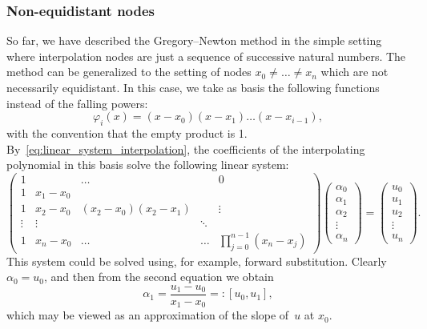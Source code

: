 \subsubsection*{Non-equidistant nodes}%
So far,
we have described the Gregory--Newton method in the simple setting where interpolation nodes are just a sequence of successive natural numbers.
The method can be generalized to the setting of nodes $x_0 \neq \dotsc \neq x_n$ which are not necessarily equidistant.
In this case, we take as basis the following functions instead of the falling powers:
\begin{equation}
    \label{eq:basis_newton}
    \varphi_{i}(x) = (x - x_0) (x - x_1) \dotsc (x - x_{i-1}),
\end{equation}
with the convention that the empty product is 1.
By~\eqref{eq:linear_system_interpolation},
the coefficients of the interpolating polynomial in this basis solve the following linear system:
\begin{equation}
    \label{eq:matrix_newton}
    \begin{pmatrix}
        1 &         & \ldots &        & 0  \\
        1 & x_1-x_0 &        &        &    \\
        1 & x_2-x_0 & (x_2-x_0)(x_2-x_1) &        & \vdots   \\
        \vdots & \vdots  &        & \ddots &    \\
        1 & x_n-x_0 & \ldots & \ldots & \prod_{j=0}^{n-1}(x_n - x_j)
    \end{pmatrix}
    \begin{pmatrix}
        \alpha_0 \\
        \alpha_1 \\
        \alpha_2 \\
        \vdots \\
        \alpha_n
    \end{pmatrix}
    =
    \begin{pmatrix}
        u_0 \\
        u_1 \\
        u_2 \\
        \vdots \\
        u_n
    \end{pmatrix}.
\end{equation}
This system could be solved using, for example, forward substitution.
Clearly $\alpha_0 = u_0$,
and then from the second equation we obtain
\[
    \alpha_1 = \frac{u_1 - u_0}{x_1 - x_0} =: [u_0, u_1],
\]
which may be viewed as an approximation of the slope of~$u$ at $x_0$.
